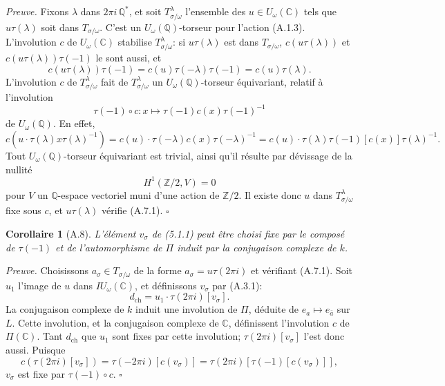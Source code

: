 \documentclass[10pt,a4paper]{article}
\newcommand{\Q}{\mathbb Q}
\newcommand{\C}{\mathbb C}
\theoremstyle{deligne}
\newtheorem*{corollary*}{Corollaire}
\newenvironment{proofdel}{\textit{Preuve.}}{\hfill$\square$}
\begin{document}
\begin{proofdel}
Fixons \(\lambda\) dans \(2\pi i\,\Q^*\), et soit \(T^\lambda_{\sigma/\omega}\) l'ensemble des \(u\in U_\omega(\C)\) tels que \(u\tau(\lambda)\) soit dans \(T_{\sigma/\omega}\). C'est un \(U_\omega(\Q)\)-torseur pour l'action (A.1.3). L'involution \(c\) de \(U_\omega(\C)\) stabilise \(T^\lambda_{\sigma/\omega}\): si \(u\tau(\lambda)\) est dans \(T_{\sigma/\omega}\), \(c(u\tau(\lambda))\) et \(c(u\tau(\lambda))\tau(-1)\) le sont aussi, et
\[
c(u\tau(\lambda))\tau(-1)=c(u)\tau(-\lambda)\tau(-1)=c(u)\tau(\lambda).
\]
L'involution \(c\) de \(T^\lambda_{\sigma/\omega}\) fait de \(T^\lambda_{\sigma/\omega}\) un \(U_\omega(\Q)\)-torseur équivariant, relatif à l'involution
\[
\tau(-1)\circ c:x\longmapsto\tau(-1)c(x)\tau(-1)^{-1}
\]
de \(U_\omega(\Q)\). En effet,
\[
c(u\cdot\tau(\lambda)x\tau(\lambda)^{-1})
=c(u)\cdot\tau(-\lambda)c(x)\tau(-\lambda)^{-1}
=c(u)\cdot\tau(\lambda)\tau(-1)[c(x)]\tau(\lambda)^{-1}.
\]
Tout \(U_\omega(\Q)\)-torseur équivariant est trivial, ainsi qu'il résulte par dévissage de la nullité
\[
H^1(\mathbb Z/2,V)=0
\]
pour \(V\) un \(\Q\)-espace vectoriel muni d'une action de \(\mathbb Z/2\). Il existe donc \(u\) dans \(T^\lambda_{\sigma/\omega}\) fixe sous \(c\), et \(u\tau(\lambda)\) vérifie (A.7.1).
\end{proofdel}

\begin{corollary*}[A.8]
L'élément \(v_\sigma\) de (5.1.1) peut être choisi fixe par le composé de \(\tau(-1)\) et de l'automorphisme de \(\Pi\) induit par la conjugaison complexe de \(k\).
\end{corollary*}

\begin{proofdel}
Choisissons \(a_\sigma\in T_{\sigma/\omega}\) de la forme \(a_\sigma=u\tau(2\pi i)\) et vérifiant (A.7.1). Soit \(u_1\) l'image de \(u\) dans \(IU_\omega(\C)\), et définissons \(v_\sigma\) par (A.3.1):
\[
d_{\mathrm{ch}}=u_1\cdot\tau(2\pi i)[v_\sigma].
\]
La conjugaison complexe de \(k\) induit une involution de \(\Pi\), déduite de \(e_a\mapsto e_{\bar a}\) sur \(L\). Cette involution, et la conjugaison complexe de \(\C\), définissent l'involution \(c\) de \(\Pi(\C)\). Tant \(d_{\mathrm{ch}}\) que \(u_1\) sont fixes par cette involution; \(\tau(2\pi i)[v_\sigma]\) l'est donc aussi. Puisque
\[
c(\tau(2\pi i)[v_\sigma])=\tau(-2\pi i)[c(v_\sigma)]
=\tau(2\pi i)[\tau(-1)[c(v_\sigma)]],
\]
\(v_\sigma\) est fixe par \(\tau(-1)\circ c\).
\end{proofdel}
\end{document}
